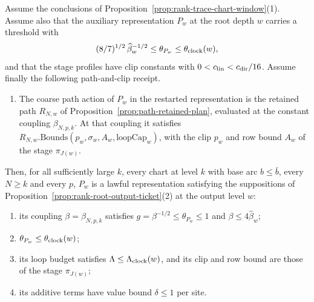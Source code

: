 \begin{proposition}
\label{prop:rank-trace-output-lawful}
Assume the conclusions of Proposition~\ref{prop:rank-trace-chart-window}(1).
Assume also that the auxiliary representation $P_w$ at the root depth $w$
carries a threshold with
\begin{equation}\label{eq:rank-trace-threshold-window}
 (8/7)^{1/2}\,\widehat\beta_w^{-1/2}\le\theta_{P_w}\le\theta_{\rm clock}(w),
\end{equation}
and that the stage profiles have clip constants with
$0<c_{\rm lin}<c_{\rm dir}/16$. Assume finally the following
path-and-clip receipt.
\begin{enumerate}
\item[(P)] The coarse path action of $P_w$ in the restarted representation
 is the retained path $R_{N,w}$ of
 Proposition~\ref{prop:path-retained-plan}, evaluated at the constant
 coupling $\beta_{N,p,k}$. At that coupling it satisfies
 $R_{N,w}.\mathrm{Bounds}(p_w,\sigma_w,A_w,\mathrm{loopCap}_w)$, with the
 clip $p_w$ and row bound $A_w$ of the stage $\pi_{J(w)}$.
\end{enumerate}
Then, for all sufficiently large $k$,
every chart at level $k$ with base arc $b\le\bar b$, every $N\ge k$ and
every $p$, $P_w$ is a lawful representation satisfying the suppositions of
Proposition~\ref{prop:rank-root-output-ticket}(2) at the output level $w$:
\begin{enumerate}
\item its coupling $\beta=\beta_{N,p,k}$ satisfies $g=\beta^{-1/2}\le\theta_{P_w}\le1$
 and $\beta\le4\widehat\beta_w$;
\item $\theta_{P_w}\le\theta_{\rm clock}(w)$;
\item its loop budget satisfies $\Lambda\le\Lambda_{\rm clock}(w)$, and its
 clip and row bound are those of the stage $\pi_{J(w)}$;
\item its additive terms have value bound $\delta\le1$ per site.
\end{enumerate}
\end{proposition}
